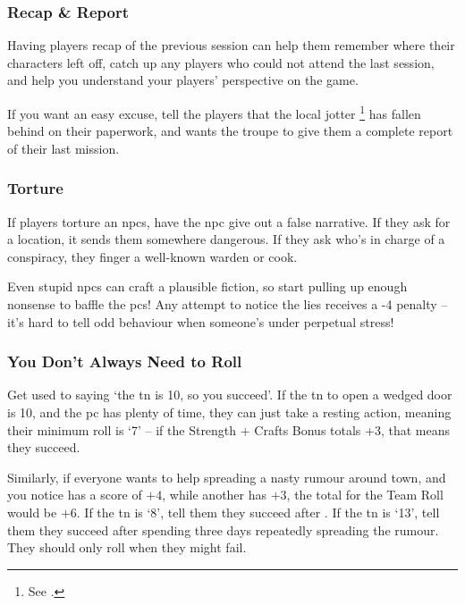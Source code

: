 \begin{multicols}{2}
\subsubsection{Recap \& Report}

Having players recap of the previous session can help them remember where their characters left off, catch up any players who could not attend the last session, and help you understand your players' perspective on the game.

If you want an easy excuse, tell the players that the local \gls{jotter}%
\footnote{See .}
has fallen behind on their paperwork, and wants the troupe to give them a complete report of their last mission.

\subsubsection{Torture}

If players torture an \glspl{npc}, have the \gls{npc} give out a false narrative.
If they ask for a location, it sends them somewhere dangerous.
If they ask who's in charge of a conspiracy, they finger a well-known \gls{warden} or cook.

Even stupid \glspl{npc} can craft a plausible fiction, so start pulling up enough nonsense to baffle the \glspl{pc}!
Any attempt to notice the lies receives a -4 penalty -- it's hard to tell odd behaviour when someone's under perpetual stress!

\subsubsection{You Don't Always Need to Roll}

Get used to saying `the \gls{tn} is 10, so you succeed'.
If the \gls{tn} to open a wedged door is 10, and the \gls{pc} has plenty of time, they can just take a resting action, meaning their minimum roll is `7' -- if the Strength + Crafts Bonus totals +3, that means they succeed.

Similarly, if everyone wants to help spreading a nasty rumour around town, and you notice  has a  score of $+4$, while another has $+3$, the total for the Team Roll would be $+6$.
If the \gls{tn} is `8', tell them they succeed after .
If the \gls{tn} is `13', tell them they succeed after spending three days repeatedly spreading the rumour.
They should only roll when they might fail.


\end{multicols}
